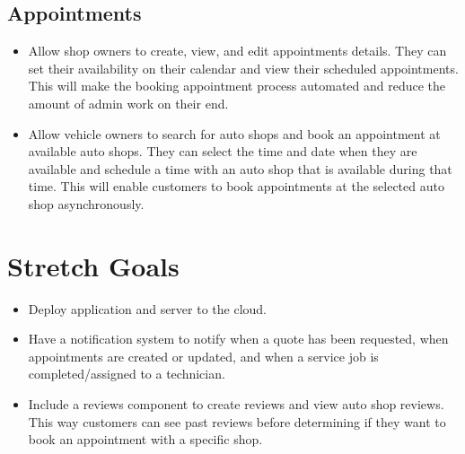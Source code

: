 \documentclass{article}
\begin{document}
\subsection{Appointments}
\begin{itemize}
\item Allow shop owners to create, view, and edit appointments details. They can set their availability on their calendar and view their scheduled appointments. This will make the booking appointment process automated and reduce the amount of admin work on their end.
\item Allow vehicle owners to search for auto shops and book an appointment at available auto shops. They can select the time and date when they are available and schedule a time with an auto shop that is available during that time. This will enable customers to book appointments at the selected auto shop asynchronously.
\end{itemize}

\section{Stretch Goals}
\begin{itemize}
    \item Deploy application and server to the cloud.
    \item Have a notification system to notify when a quote has been requested, when appointments are created or updated, and when a service job is completed/assigned to a technician.
    \item Include a reviews component to create reviews and view auto shop reviews. This way customers can see past reviews before determining if they want to book an appointment with a specific shop.
\end{itemize}
\end{document}
